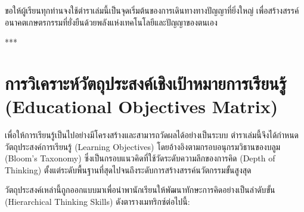 \documentclass[11pt,a4paper,openany]{report}
\begin{document}
ขอให้ผู้เรียนทุกท่านจงใช้ตำราเล่มนี้เป็นจุดเริ่มต้นของการเดินทางทางปัญญาที่ยิ่งใหญ่ เพื่อสร้างสรรค์อนาคตเกษตรกรรมที่ยั่งยืนด้วยพลังแห่งเทคโนโลยีและปัญญาของตนเอง

***

\section{การวิเคราะห์วัตถุประสงค์เชิงเป้าหมายการเรียนรู้ (Educational Objectives Matrix)}


เพื่อให้การเรียนรู้เป็นไปอย่างมีโครงสร้างและสามารถวัดผลได้อย่างเป็นระบบ ตำราเล่มนี้จึงได้กำหนดวัตถุประสงค์การเรียนรู้ (Learning Objectives) โดยอ้างอิงตามกรอบอนุกรมวิธานของบลูม (Bloom's Taxonomy) ซึ่งเป็นกรอบแนวคิดที่ใช้วัดระดับความลึกของการคิด (Depth of Thinking) ตั้งแต่ระดับพื้นฐานที่สุดไปจนถึงระดับการสร้างสรรค์นวัตกรรมขั้นสูงสุด

วัตถุประสงค์เหล่านี้ถูกออกแบบมาเพื่อนำพานักเรียนให้พัฒนาทักษะการคิดอย่างเป็นลำดับขั้น (Hierarchical Thinking Skills) ดังตารางเมทริกซ์ต่อไปนี้:
\end{document}
